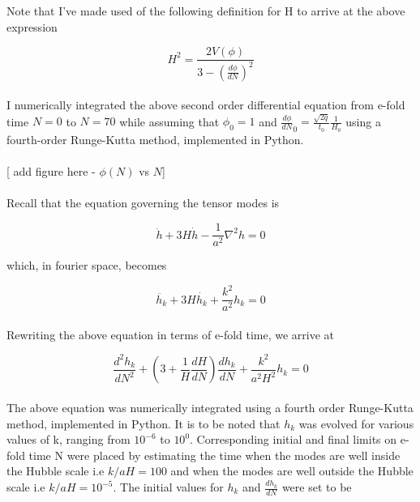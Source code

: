 \documentclass[12pt, a4paper]{report}
\begin{document}
\noindent Note that I've made used of the following definition for H to arrive at the above expression

$$H^2 = \frac{2V(\phi)}{3-(\frac{d\phi}{dN})^2}$$

\paragraph*{} I numerically integrated the above second order differential equation from e-fold time $N = 0$ to $N = 70$ while assuming that $\phi_0 = 1$ and $\frac{d\phi}{dN}_0 = \frac{\sqrt{2q}}{t_0}\frac{1}{H_0}$ using a fourth-order Runge-Kutta method, implemented in Python.

\paragraph*{} [ add figure here - $\phi(N)$ vs $N$]

\paragraph*{} Recall that the equation governing the tensor modes is

$$\ddot{h} + 3H\dot{h} - \frac{1}{a^2}\nabla ^2h = 0$$

\noindent which, in fourier space, becomes

$$\ddot{h_k} + 3H\dot{h_k} + \frac{k^2}{a^2}h_k = 0$$

\paragraph*{} Rewriting the above equation in terms of e-fold time, we arrive at

$$\frac{d^2h_k}{dN^2} + (3+\frac{1}{H}\frac{dH}{dN})\frac{dh_k}{dN} + \frac{k^2}{a^2H^2}h_k = 0$$

\paragraph*{} The above equation was numerically integrated using a fourth order Runge-Kutta method, implemented in Python. It is to be noted that $h_k$ was evolved for various values of k, ranging from $10^{-6}$ to $10^{0}$. Corresponding initial and final limits on e-fold time N were placed by estimating the time when the modes are well inside the Hubble scale i.e $k/aH =  100$ and when the modes are well outside the Hubble scale i.e $k/aH =  10^{-5}$. The initial values for $h_k$ and $\frac{dh_k}{dN}$ were set to be
\end{document}
